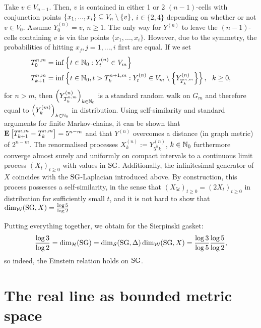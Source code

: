 Take $v\in V_{n-1}$. Then, $v$ is contained in either 1 or 2 $(n-1)$-cells with conjunction points 
$\{x_1,...,x_i\}\subseteq V_n\setminus\{v\}$, $i\in\{2,4\}$ depending on whether or not $v\in V_0$. Assume $Y^{(n)}_0=v$, $n\geq1$. The only way for $Y^{(n)}$ to leave the $(n-1)$-cells containing $v$ is via the points $\{x_1,...,x_i\}$. However, due to the symmetry, the probabilities of hitting $x_j, j=1,...,i$ first are equal. If we set 
\begin{align*}
  T^{n,m}_0&=\inf\left\{t\in\mathbb{N}_0:Y^{(n)}_t\in V_m\right\}\\
  T^{n,m}_{k+1} &=\inf\left\{t\in\mathbb{N}_0, t>T^{n+1,m}_k:
     Y^{(n)}_t\in V_m\setminus \left\{Y^{(n)}_{T^{n,m}_k}\right\}\right\},\ \ k\geq0,
\end{align*}
for $n>m$, then $\left(Y^{(n)}_{T^{n,m}_k}\right)_{k\in\mathbb{N}_0}$ is a standard random walk on $G_m$ and therefore equal to 
$\left(Y^{(m)}_k\right)_{k\in\mathbb{N}_0}$ in distribution. Using self-similarity and standard arguments for finite Markov-chains, it can be shown that $\mathbf{E}\left[{T^{n,m}_{k+1}-T^{n,m}_k}\right]=5^{n-m}$ and that $Y^{(n)}$ overcomes a distance (in graph metric) of $2^{n-m}$. The renormalised processes $X^{(n)}_k:=Y^{(n)}_{5^nk}$, $k\in\mathbb{N}_0$ furthermore converge almost surely and uniformly on compact intervals to a continuous limit process $(X_t)_{t\geq0}$ with values in $\operatorname{SG}$. Additionally, the infinitesimal generator of $X$ coincides with the $\operatorname{SG}$-Laplacian introduced above. 
By construction, this process possesses a self-similarity, in the sense that $(X_{5t})_{t\geq0}=(2X_t)_{t\geq0}$ in distribution for sufficiently small $t$, and it is not hard to show that $\dim_{\mathcal{W}}(\operatorname{SG},X)=\frac{\log 5}{\log 2}$

Putting everything together, we obtain for the Sierpinski gasket:
\[
  \frac{\log 3}{\log 2}=\dim_{\mathcal{H}}(\operatorname{SG})=\dim_{\mathcal{S}}(\operatorname{SG},\Delta)\dim_{\mathcal{W}}(\operatorname{SG},X)
  =\frac{\log 3}{\log 5}\frac{\log 5}{\log 2},
\]
so indeed, the Einstein relation holds on $\operatorname{SG}$.


\section{The real line as bounded metric space}

